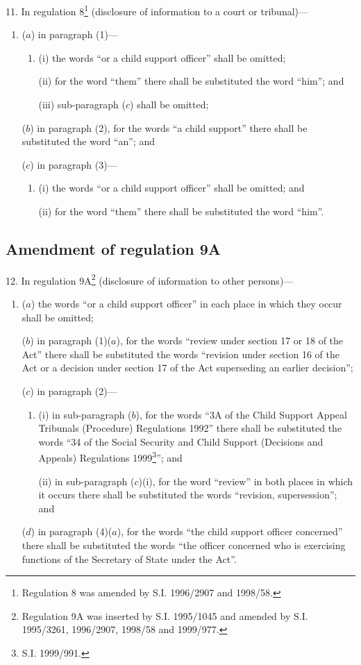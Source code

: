 \documentclass[12pt,a4paper]{article}
\begin{document}
11.  In regulation 8\footnote{\frenchspacing Regulation 8 was amended by S.I. 1996/2907 and 1998/58.} (disclosure of information to a court or tribunal)—
\begin{enumerate}\item[]
($a$) in paragraph (1)—
\begin{enumerate}\item[]
(i) the words “or a child support officer” shall be omitted;

(ii) for the word “them” there shall be substituted the word “him”; and

(iii) sub-paragraph ($c$) shall be omitted;
\end{enumerate}

($b$) in paragraph (2), for the words “a child support” there shall be substituted the word “an”; and

($c$) in paragraph (3)—
\begin{enumerate}\item[]
(i) the words “or a child support officer” shall be omitted; and

(ii) for the word “them” there shall be substituted the word “him”.
\end{enumerate}
\end{enumerate}

\subsection[12. Amendment of regulation 9A]{Amendment of regulation 9A}

12.  In regulation 9A\footnote{\frenchspacing Regulation 9A was inserted by S.I. 1995/1045 and amended by S.I. 1995/3261, 1996/2907, 1998/58 and 1999/977.} (disclosure of information to other persons)—
\begin{enumerate}\item[]
($a$) the words “or a child support officer” in each place in which they occur shall be omitted;

($b$) in paragraph (1)($a$), for the words “review under section 17 or 18 of the Act” there shall be substituted the words “revision under section 16 of the Act or a decision under section 17 of the Act superseding an earlier decision”;

($c$) in paragraph (2)—
\begin{enumerate}\item[]
(i) in sub-paragraph ($b$), for the words “3A of the Child Support Appeal Tribunals (Procedure) Regulations 1992” there shall be substituted the words “34 of the Social Security and Child Support (Decisions and Appeals) Regulations 1999\footnote{\frenchspacing S.I. 1999/991.}”; and

(ii) in sub-paragraph ($c$)(i), for the word “review” in both places in which it occurs there shall be substituted the words “revision, supersession”; and
\end{enumerate}

($d$) in paragraph (4)($a$), for the words “the child support officer concerned” there shall be substituted the words “the officer concerned who is exercising functions of the Secretary of State under the Act”.
\end{enumerate}
\end{document}

